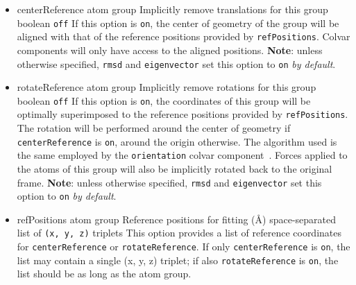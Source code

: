 \begin{itemize}

\item %
  \keydef
    {centerReference}{%
    atom group}{%
    Implicitly remove translations for this group}{%
    boolean}{%
    \texttt{off}}{%
    If this option is \texttt{on}, the center of geometry of the group will be aligned with that of the reference positions provided by  \texttt{refPositions}.
    Colvar components will only have access to the aligned positions.
\textbf{Note}: unless otherwise specified, \texttt{rmsd} and \texttt{eigenvector} set this option to \texttt{on} \emph{by default}.
}

\item %
  \keydef
    {rotateReference}{%
    atom group}{%
    Implicitly remove rotations for this group}{%
    boolean}{%
    \texttt{off}}{%
    If this option is \texttt{on}, the coordinates of this group will be optimally superimposed to the reference positions provided by  \texttt{refPositions}.
    The rotation will be performed around the center of geometry if \texttt{centerReference} is \texttt{on}, around the origin otherwise.
    The algorithm used is the same employed by the \texttt{orientation} colvar component~\cite{Coutsias2004}.
    Forces applied to the atoms of this group will also be implicitly rotated back to the original frame.
    \textbf{Note}: unless otherwise specified, \texttt{rmsd} and \texttt{eigenvector} set this option to \texttt{on} \emph{by default}.
}

\item %
  \key
    {refPositions}{%
    atom group}{%
    Reference positions for fitting (\AA)}{%
    space-separated list of \texttt{(x, y, z)} triplets}{%
    This option provides a list of reference coordinates for \texttt{centerReference} or \texttt{rotateReference}.
    If only \texttt{centerReference} is \texttt{on}, the list may contain a single (x, y, z) triplet; if also \texttt{rotateReference} is \texttt{on}, the list should be as long as the atom group.
}

\end{itemize}
